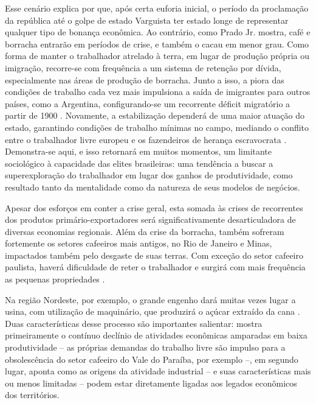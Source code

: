 Esse cenário explica por que, após certa euforia inicial, o
período da proclamação da república até o golpe de estado Varguista ter
estado longe de representar qualquer tipo de bonança econômica. Ao
contrário, como Prado Jr.
\citep{pradojunior2012}
mostra, café e borracha entrarão em períodos de crise, e também o
cacau em menor grau. Como forma de manter o trabalhador atrelado à
terra, em lugar de produção própria ou imigração, recorre-se com
frequência a um sistema de retenção por dívida, especialmente nas áreas
de produção de borracha. Junto a isso, a piora das condições de trabalho
cada vez mais impulsiona a saída de imigrantes para outros países, como a
Argentina, configurando-se um recorrente déficit migratório a partir de
1900 \citep{pradojunior2012}. Novamente, a estabilização dependerá de uma maior atuação
do estado, garantindo condições de trabalho mínimas no campo, mediando o
conflito entre o trabalhador livre europeu e os fazendeiros de herança
escravocrata \citep{pradojunior2012}. Demonstra-se aqui, e isso retornará em muitos momentos,
um limitante sociológico à capacidade das elites brasileiras: uma
tendência a buscar a superexploração do trabalhador em lugar dos ganhos
de produtividade, como resultado tanto da mentalidade como da natureza
de seus modelos de negócios.

Apesar dos esforços em conter a crise geral, esta somada às crises de
recorrentes dos produtos primário-exportadores será significativamente
desarticuladora de diversas economias regionais. Além da crise da
borracha, também sofreram fortemente os setores cafeeiros mais antigos,
no Rio de Janeiro e Minas, impactados também pelo desgaste de suas
terras. Com exceção do setor cafeeiro paulista, haverá dificuldade de
reter o trabalhador e surgirá com mais frequência as pequenas
propriedades \citep{pradojunior2012}.

Na região Nordeste, por exemplo, o grande engenho dará muitas vezes
lugar a usina, com utilização de maquinário, que produzirá o açúcar
extraído da cana
\citep{pradojunior2012}.
Duas características desse processo são importantes salientar:
mostra primeiramente o contínuo declínio de atividades econômicas
amparadas em baixa produtividade -- as próprias demandas do trabalho
livre são impulso para a obsolescência do setor cafeeiro do Vale do
Paraíba, por exemplo --, em segundo lugar, aponta como as origens da
atividade industrial -- e suas características mais ou menos limitadas
-- podem estar diretamente ligadas aos legados econômicos dos
territórios.

